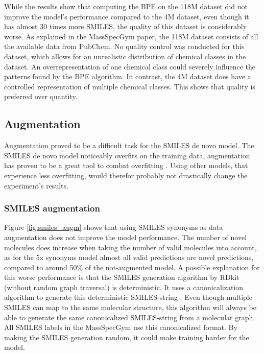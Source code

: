 While the results show that computing the \ac{BPE} on the 118M dataset did not improve the model's performance compared to the 4M dataset, even though it has almost 30 times more SMILES,
the quality of this dataset is considerably worse.
As explained in the MassSpecGym paper, the 118M dataset consists of all the available data from PubChem. 
No quality control was conducted for this dataset, which allows for an unrealistic distribution of chemical classes in the dataset.
An overrepresentation of one chemical class could severely influence the patterns found by the \ac{BPE} algorithm.
In contrast, the 4M dataset does have a controlled representation of multiple chemical classes.
This shows that quality is preferred over quantity.

\subsection{Augmentation}

Augmentation proved to be a difficult task for the SMILES de novo model.
The SMILES de novo model noticeably overfits on the training data, augmentation has proven to be a great tool to combat overfitting \cite{shorten2019survey}.
Using other models, that experience less overfitting, would therefor probably not drastically change the experiment's results.

\subsubsection*{SMILES augmentation}

Figure \ref{fig:smiles_augm} shows that using SMILES synonyms as data augmentation does not improve the model performance.
The number of novel molecules does increase when taking the number of valid molecules into account, as for the 5x synonyms model almost all valid predictions are novel predictions, compared to around 50\% of the not-augmented model.
A possible explanation for this worse performance is that the SMILES generation algorithm by RDkit (without random graph traversal) is deterministic.
It uses a canonicalization algorithm to generate this deterministic SMILES-string \cite{daylight_smiles_theory}.
Even though multiple SMILES can map to the same molecular structure, this algorithm will always be able to generate the same canonicalized SMILES-string from a molecular graph.
All SMILES labels in the MassSpecGym use this canonicalized format. 
By making the SMILES generation random, it could make training harder for the model.

